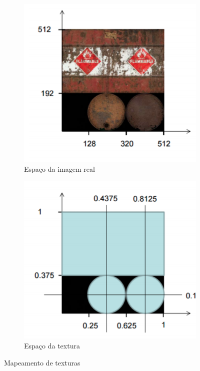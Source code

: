 \documentclass[a4paper, 11pt]{article}
\begin{document}
\begin{figure}[H]
	\centering
	\begin{subfigure}{.35\textwidth}
		\centering
		\includegraphics[width=\textwidth]{img/text1.png}
		\caption{Espaço da imagem real}
	\end{subfigure}%
	\begin{subfigure}{.35\textwidth}
		\centering
		\includegraphics[width=\textwidth]{img/text2.png}
		\caption{Espaço da textura}
	\end{subfigure}
	\caption{Mapeamento de texturas}
\end{figure}
\end{document}
